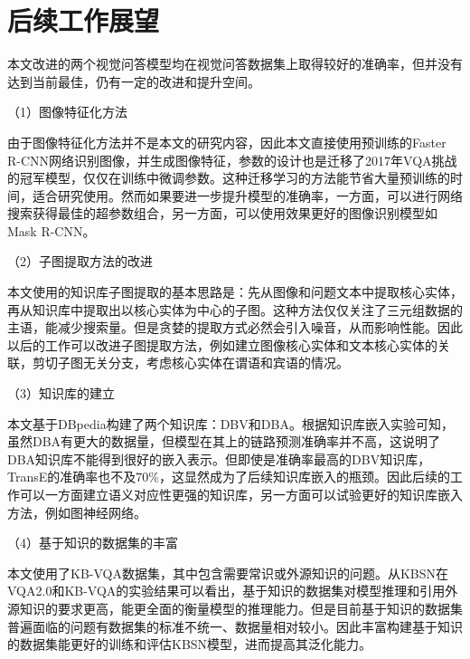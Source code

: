 \section{后续工作展望}
本文改进的两个视觉问答模型均在视觉问答数据集上取得较好的准确率，但并没有达到当前最佳，仍有一定的改进和提升空间。

（1）图像特征化方法

由于图像特征化方法并不是本文的研究内容，因此本文直接使用预训练的Faster R-CNN网络识别图像，并生成图像特征，参数的设计也是迁移了2017年VQA挑战的冠军模型，仅仅在训练中微调参数。这种迁移学习的方法能节省大量预训练的时间，适合研究使用。然而如果要进一步提升模型的准确率，一方面，可以进行网络搜索获得最佳的超参数组合，另一方面，可以使用效果更好的图像识别模型如Mask R-CNN。

（2）子图提取方法的改进

本文使用的知识库子图提取的基本思路是：先从图像和问题文本中提取核心实体，再从知识库中提取出以核心实体为中心的子图。这种方法仅仅关注了三元组数据的主语，能减少搜索量。但是贪婪的提取方式必然会引入噪音，从而影响性能。因此以后的工作可以改进子图提取方法，例如建立图像核心实体和文本核心实体的关联，剪切子图无关分支，考虑核心实体在谓语和宾语的情况。

（3）知识库的建立

本文基于DBpedia构建了两个知识库：DBV和DBA。根据知识库嵌入实验可知，虽然DBA有更大的数据量，但模型在其上的链路预测准确率并不高，这说明了DBA知识库不能得到很好的嵌入表示。但即使是准确率最高的DBV知识库，TransE的准确率也不及70\%，这显然成为了后续知识库嵌入的瓶颈。因此后续的工作可以一方面建立语义对应性更强的知识库，另一方面可以试验更好的知识库嵌入方法，例如图神经网络。

（4）基于知识的数据集的丰富

本文使用了KB-VQA数据集，其中包含需要常识或外源知识的问题。从KBSN在VQA2.0和KB-VQA的实验结果可以看出，基于知识的数据集对模型推理和引用外源知识的要求更高，能更全面的衡量模型的推理能力。但是目前基于知识的数据集普遍面临的问题有数据集的标准不统一、数据量相对较小。因此丰富构建基于知识的数据集能更好的训练和评估KBSN模型，进而提高其泛化能力。

